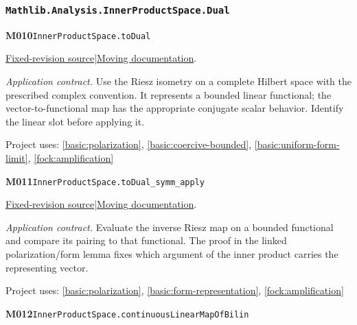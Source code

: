 \documentclass[11pt,a4paper]{article}
\theoremstyle{definition}
\theoremstyle{remark}
\begin{document}
\subsubsection*{\nolinkurl{Mathlib.Analysis.InnerProductSpace.Dual}}
\noindent\textbf{M010}\label{base:M010}\quad\nolinkurl{InnerProductSpace.toDual}

\href{https://github.com/leanprover-community/mathlib4/blob/9bac2d0692944a775113f7c130fd5e5b4608a854/Mathlib/Analysis/InnerProductSpace/Dual.lean}{Fixed-revision source}\quad|\quad\href{https://leanprover-community.github.io/mathlib4_docs/Mathlib/Analysis/InnerProductSpace/Dual.html#InnerProductSpace.toDual}{Moving documentation}.\par
\noindent\textit{Application contract.} Use the Riesz isometry on a complete Hilbert space with the prescribed complex convention. It represents a bounded linear functional; the vector-to-functional map has the appropriate conjugate scalar behavior. Identify the linear slot before applying it.\par
{\small Project uses: \ref{basic:polarization}, \ref{basic:coercive-bounded}, \ref{basic:uniform-form-limit}, \ref{fock:amplification}}\par\medskip

\noindent\textbf{M011}\label{base:M011}\quad\nolinkurl{InnerProductSpace.toDual_symm_apply}

\href{https://github.com/leanprover-community/mathlib4/blob/9bac2d0692944a775113f7c130fd5e5b4608a854/Mathlib/Analysis/InnerProductSpace/Dual.lean}{Fixed-revision source}\quad|\quad\href{https://leanprover-community.github.io/mathlib4_docs/Mathlib/Analysis/InnerProductSpace/Dual.html#InnerProductSpace.toDual_symm_apply}{Moving documentation}.\par
\noindent\textit{Application contract.} Evaluate the inverse Riesz map on a bounded functional and compare its pairing to that functional. The proof in the linked polarization/form lemma fixes which argument of the inner product carries the representing vector.\par
{\small Project uses: \ref{basic:polarization}, \ref{basic:form-representation}, \ref{fock:amplification}}\par\medskip

\noindent\textbf{M012}\label{base:M012}\quad\nolinkurl{InnerProductSpace.continuousLinearMapOfBilin}
\end{document}

